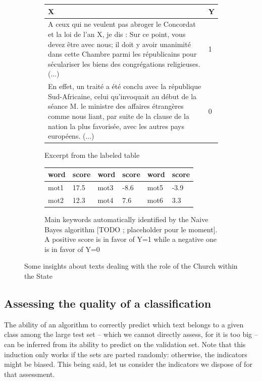 \documentclass[a4paper,11pt]{article}
\begin{document}
\begin{figure}
	\begin{subfigure}{\textwidth}
		\begin{tabular}{|p{11cm}|l|}
		\hline
		X & Y\\
		\hline
		A ceux qui ne veulent pas abroger le Concordat et la loi de l'an X, je dis : Sur ce point, vous devez être avec nous; il doit y avoir unanimité dans cette Chambre parmi les républicains pour séculariser les biens des congrégations religieuses. (...) & 1\\
		\hline
		En effet, un traité a été conclu avec la république Sud-Africaine, celui qu'invoquait au début de la séance M. le ministre des affaires étrangères comme nous liant, par suite de la clause de la nation la plus favorisée, avec les autres pays européens. (...) & 0\\
		\hline
		\end{tabular}
		\caption{Excerpt from the labeled table}
	\end{subfigure}

	\begin{subfigure}{\textwidth}
	\begin{center}
		\begin{tabular}{|l|l||l|l||l|l|}
		\hline
		word & score & word & score & word & score\\
		\hline
		mot1 & 17.5 & mot3 & -8.6&  mot5 & -3.9 \\
		mot2 & 12.3 & mot4 & 7.6 & mot6 & 3.3\\
		\hline
		\end{tabular}
	\end{center}
	\caption{Main keywords automatically identified by the Naive Bayes algorithm [TODO ; placeholder pour le moment]. A positive score is in favor of Y=1 while a negative one is in favor of Y=0}
	\end{subfigure}
\caption{Some insights about texts dealing with the role of the Church within the State}
\label{fig:naifbayes}
\end{figure}

\subsection*{Assessing the quality of a classification}

The ability of an algorithm to correctly predict which text belongs to a given class among the large test set -- which we cannot directly assess, for it is too big -- can be inferred from its ability to predict on the validation set. Note that this induction only works if the sets are parted randomly: otherwise, the indicators might be biased. This being said, let us consider the indicators we dispose of for that assessment.
\end{document}
